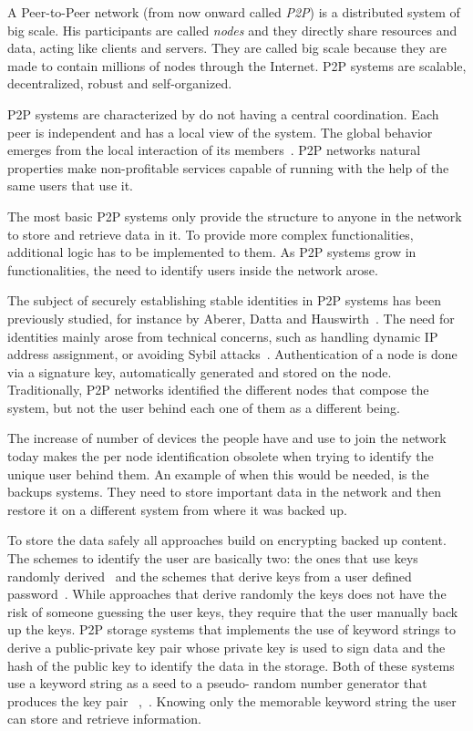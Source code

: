 \documentclass[12pt,spanish]{article}
\begin{document}
A Peer-to-Peer network (from now onward called \textit{P2P}) is a distributed system of big scale. His participants
are called \textit{nodes} and they directly share resources and data, acting
like clients and servers. They are called big scale because they are made to
contain millions of nodes through the Internet. P2P systems are scalable,
decentralized, robust and self-organized.

P2P systems are characterized by do not having a central coordination. Each
peer is independent and has a local view of the system. The global behavior
emerges from the local interaction of its members~\cite{Aberer:2001:PIS:503271.503268}.
P2P networks natural properties make non-profitable services capable of running
with the help of the same users that use it. 

The most basic P2P systems only provide the structure to anyone in the network
to store and retrieve data in it. To provide more complex functionalities,
additional logic has to be implemented to them.
As P2P systems grow in functionalities, the need to identify users inside the
network arose.

The subject of securely establishing stable identities in P2P
systems has been previously studied, for instance by Aberer,
Datta and Hauswirth~\cite{1318567}. The need for identities mainly arose
from technical concerns, such as handling dynamic IP address
assignment, or avoiding Sybil attacks~\cite{the_sybil_attack}. Authentication of a
node is done via a signature key, automatically generated and
stored on the node. Traditionally, P2P networks identified the different nodes that compose the
system, but not the user behind each one of them as a different being.

The increase of number of devices the people have and use to join the network
today makes the per node identification obsolete when trying to identify the
unique user behind them. An example of when this would be needed, is the
backups systems. They need to store important data in the network and then
restore it on a different system from where it was backed up.

To store the data safely all approaches build on encrypting backed up content.
The schemes to identify the user are basically two: the ones that
use keys randomly derived~\cite{Lillibridge:2003:CIB:1247340.1247343} and the schemes that derive
keys from a user defined password~\cite{Cox:2002:PMB:844128.844155}. While
approaches that derive randomly the keys does not have the risk of someone
guessing the user keys, they require that the user manually back up the
keys. 
P2P storage systems that implements the use of keyword strings to derive a
public-private key pair whose private key is used to sign data and the hash of
the public key to identify the data in the storage. Both of
these systems use a keyword string as a seed to a pseudo-
random number generator that produces the key pair ~\cite{clarke2010private},~\cite{Bennett03anencoding}.
Knowing only the memorable keyword string the user can
store and retrieve information.
\end{document}

